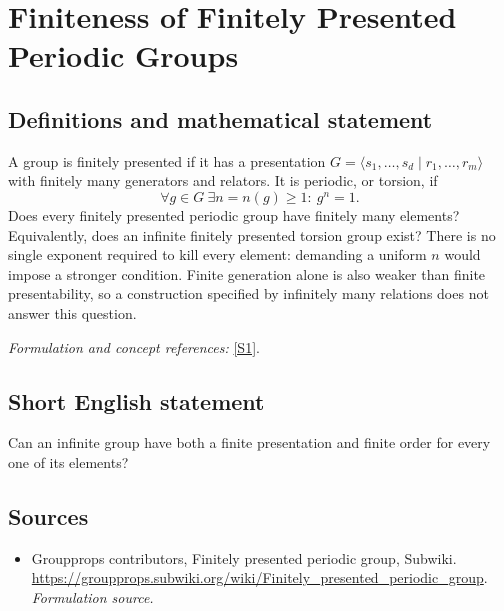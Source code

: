 \documentclass[11pt]{article}
\begin{document}
\section*{\texorpdfstring{Finiteness of Finitely Presented Periodic Groups}{Finiteness of Finitely Presented Periodic Groups}}\label{1195}
\subsection{Definitions and mathematical statement}
A group is finitely presented if it has a presentation $G=\langle s_1,\ldots,s_d\mid r_1,\ldots,r_m\rangle$ with finitely many generators and relators. It is periodic, or torsion, if
\[
 \forall g\in G\ \exists n=n(g)\ge1:\ g^n=1.
\]
Does every finitely presented periodic group have finitely many elements? Equivalently, does an infinite finitely presented torsion group exist? There is no single exponent required to kill every element: demanding a uniform $n$ would impose a stronger condition. Finite generation alone is also weaker than finite presentability, so a construction specified by infinitely many relations does not answer this question.
\par\smallskip\textit{Formulation and concept references:} \href{https://groupprops.subwiki.org/wiki/Finitely_presented_periodic_group}{[S1]}.

\subsection{Short English statement}
Can an infinite group have both a finite presentation and finite order for every one of its elements?
\subsection{Sources}
\begin{itemize}
\item[S1]Groupprops contributors, Finitely presented periodic group, Subwiki.
\url{https://groupprops.subwiki.org/wiki/Finitely_presented_periodic_group}.
\textit{Formulation source.}
\end{itemize}
\end{document}

